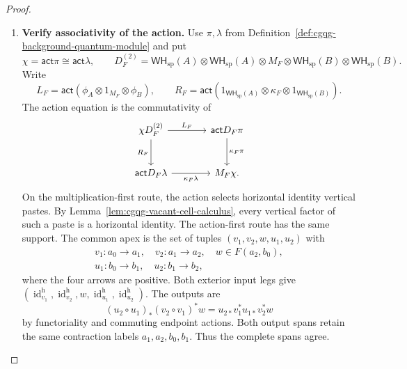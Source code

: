 \documentclass[oneside]{article}
\newcommand{\WH}{\mathsf{WH}}
\newcommand{\id}{\operatorname{id}}
\newcommand{\act}{\mathsf{act}}
\theoremstyle{plain}
\theoremstyle{definition}
\theoremstyle{remark}
\begin{document}
\begin{proof}
\begin{enumerate}[beginpenalty=10000]
        \item \textbf{Verify associativity of the action.}
        Use \(\pi,\lambda\) from
        Definition~\ref{def:cgqg-background-quantum-module} and put
        \[
        \chi=\act\pi\cong \act\lambda,\qquad
        D_F^{(2)}=\WH_{\mathrm{sp}}(A)\otimes \WH_{\mathrm{sp}}(A)\otimes M_F\otimes \WH_{\mathrm{sp}}(B)\otimes \WH_{\mathrm{sp}}(B).
        \]
        Write
        \[
        L_F=\act(\phi_A\otimes1_{M_F}\otimes\phi_B),\qquad
        R_F=\act(1_{\WH_{\mathrm{sp}}(A)}\otimes\kappa_F\otimes1_{\WH_{\mathrm{sp}}(B)}).
        \]
        The action equation is the commutativity of
        \[
        \begin{tikzcd}[column sep=large,row sep=large]
        \chi D_F^{(2)}\arrow[r,"L_F"]\arrow[d,"R_F"']
          &\act D_F\pi\arrow[d,"\kappa_F\pi"]\\
        \act D_F\lambda\arrow[r,"\kappa_F\lambda"']&M_F\chi.
        \end{tikzcd}
        \]
        On the multiplication-first route, the action selects
        horizontal identity vertical pastes. By
        Lemma~\ref{lem:cgqg-vacant-cell-calculus}, every vertical
        factor of such a paste is a horizontal identity. The
        action-first route has the same support. The common apex is
        the set of tuples \((v_1,v_2,w,u_1,u_2)\) with
        \[
        \begin{gathered}
        v_1:a_0\to a_1,\quad v_2:a_1\to a_2,\quad
        w\in F(a_2,b_0),\\
        u_1:b_0\to b_1,\quad u_2:b_1\to b_2,
        \end{gathered}
        \]
        where the four arrows are positive. Both exterior input legs
        give
        \((\id_{v_1}^{\mathrm h},\id_{v_2}^{\mathrm h},w,
        \id_{u_1}^{\mathrm h},\id_{u_2}^{\mathrm h})\). The outputs are
        \[
        (u_2\circ u_1)_*(v_2\circ v_1)^*w
          =u_{2*}v_1^*u_{1*}v_2^*w
        \]
        by functoriality and commuting endpoint actions. Both output
        spans retain the same contraction labels \(a_1,a_2,b_0,b_1\).
        Thus the complete spans agree.


\end{enumerate}
\end{proof}
\end{document}
